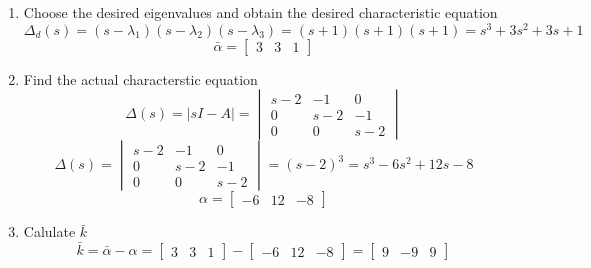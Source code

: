   \begin{enumerate}
  \item Choose the desired eigenvalues and obtain the desired characteristic equation
    \begin{equation}
      \Delta_d(s) =
      (s-\lambda_1)(s-\lambda_2)(s-\lambda_3) =
      (s+1)(s+1)(s+1) =
      s^3 + 3s^2 + 3s + 1
    \end{equation}
    \begin{equation}
      \bar \alpha  =
      \begin{bmatrix}
        3 & 3 & 1
      \end{bmatrix}
    \end{equation}
  \item Find the actual characterstic equation
    \begin{equation}
      \Delta(s) = \vert sI -A \vert =
      \begin{vmatrix}
        s-2 & -1 & 0 \\
        0 & s-2 & -1 \\
        0 & 0 & s-2
      \end{vmatrix}
    \end{equation}
    \begin{equation}
      \Delta(s) = 
      \begin{vmatrix}
        s-2 & -1 & 0 \\
        0 & s-2 & -1 \\
        0 & 0 & s-2
      \end{vmatrix} =
      (s-2)^3 =
      s^3 - 6s^2 + 12s - 8
    \end{equation}
    \begin{equation}
      \alpha = 
      \begin{bmatrix}
        -6 & 12 & -8
      \end{bmatrix}
    \end{equation}
  \item Calulate $\bar k$
    \begin{equation}
      \bar k = \bar \alpha - \alpha =
      \begin{bmatrix}
        3 & 3 & 1
      \end{bmatrix} - 
      \begin{bmatrix}
        -6 & 12 & -8
      \end{bmatrix} =
      \begin{bmatrix}
        9 & -9 & 9
      \end{bmatrix}
    \end{equation}

\end{enumerate}
